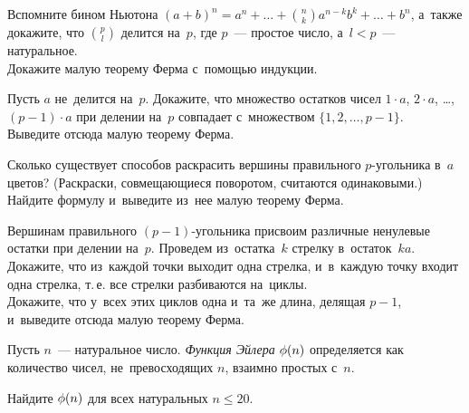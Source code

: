 \begin{problems}

\item
\subproblem
Вспомните бином Ньютона
\(
    (a + b)^{n}
=
    a^{n} + \ldots + \binom{n}{k} a^{n-k} b^{k} + \ldots + b^{n}
\),
а~также докажите, что $\binom{p}{l}$ делится на~$p$, где $p$~--- простое число,
а~$l < p$~--- натуральное.
\\
\subproblem
Докажите малую теорему Ферма с~помощью индукции.

\item%
\label{/algebra/number-theory/ferma-euler-theorem-g8/1-r1/:problem:proof-2}%
\subproblem
Пусть $a$ не~делится на~$p$.
Докажите, что множество остатков чисел
$1 \cdot a$, $2\cdot a$, \ldots, $(p - 1) \cdot a$ при делении на~$p$ совпадает
с~множеством $\{ 1, 2, \ldots, p - 1 \}$.
\\
\subproblem
Выведите отсюда малую теорему Ферма.

\item
Сколько существует способов раскрасить вершины правильного $p$-угольника
в~$a$ цветов?
(Раскраски, совмещающиеся поворотом, считаются одинаковыми.)
Найдите формулу и~выведите из~нее малую теорему Ферма.

\item
\label{/algebra/number-theory/ferma-euler-theorem-g8/1-r1/:problem:proof-4}%
Вершинам правильного $(p - 1)$-угольника присвоим различные ненулевые остатки
при делении на~$p$.
Проведем из~остатка~$k$ стрелку в~остаток~$k a$.
\\
\subproblem
Докажите, что из~каждой точки выходит одна стрелка, и~в~каждую точку входит
одна стрелка, т.\,е. все стрелки разбиваются на~циклы.
\\
\subproblem
Докажите, что у~всех этих циклов одна и~та~же длина, делящая $p - 1$,
и~выведите отсюда малую теорему Ферма.


\end{problems}

Пусть $n$~--- натуральное число.
\emph{Функция Эйлера} $\phi(n)$ определяется как количество чисел,
не~превосходящих $n$, взаимно простых с~$n$.

Найдите $\phi(n)$ для всех натуральных $n \leq 20$.

